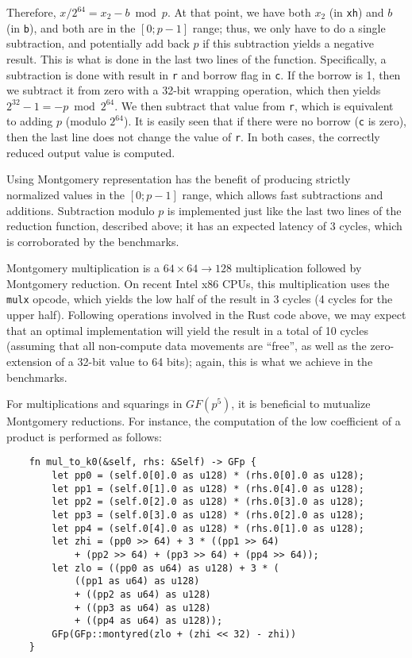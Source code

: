 \documentclass{llncs}
\newcommand{\GF}{GF}
\begin{document}
\begin{itemize}
    Therefore, $x/2^{64} = x_2 - b \bmod p$. At that point, we have both
    $x_2$ (in \verb+xh+) and $b$ (in \verb+b+), and both are in the
    $[0;p-1]$ range; thus, we only have to do a single subtraction, and
    potentially add back $p$ if this subtraction yields a negative
    result. This is what is done in the last two lines of the function.
    Specifically, a subtraction is done with result in \verb+r+ and
    borrow flag in \verb+c+. If the borrow is 1, then we subtract it
    from zero with a 32-bit wrapping operation, which then yields
    $2^{32}-1 = -p \bmod 2^{64}$. We then subtract that value from
    \verb+r+, which is equivalent to adding $p$ (modulo $2^{64}$). It is
    easily seen that if there were no borrow (\verb+c+ is zero), then
    the last line does not change the value of \verb+r+. In both cases,
    the correctly reduced output value is computed.

\end{itemize}

Using Montgomery representation has the benefit of producing strictly
normalized values in the $[0;p-1]$ range, which allows fast subtractions
and additions. Subtraction modulo $p$ is implemented just like the last
two lines of the reduction function, described above; it has an expected
latency of 3 cycles, which is corroborated by the benchmarks.

Montgomery multiplication is a $64\times 64\rightarrow 128$
multiplication followed by Montgomery reduction. On recent Intel x86
CPUs, this multiplication uses the \verb+mulx+ opcode, which yields the
low half of the result in 3 cycles (4 cycles for the upper half).
Following operations involved in the Rust code above, we may expect that
an optimal implementation will yield the result in a total of 10 cycles
(assuming that all non-compute data movements are ``free'', as well as
the zero-extension of a 32-bit value to 64 bits); again, this is what we
achieve in the benchmarks.

For multiplications and squarings in $\GF(p^5)$, it is beneficial to
mutualize Montgomery reductions. For instance, the computation of the
low coefficient of a product is performed as follows:
\begin{verbatim}
    fn mul_to_k0(&self, rhs: &Self) -> GFp {
        let pp0 = (self.0[0].0 as u128) * (rhs.0[0].0 as u128);
        let pp1 = (self.0[1].0 as u128) * (rhs.0[4].0 as u128);
        let pp2 = (self.0[2].0 as u128) * (rhs.0[3].0 as u128);
        let pp3 = (self.0[3].0 as u128) * (rhs.0[2].0 as u128);
        let pp4 = (self.0[4].0 as u128) * (rhs.0[1].0 as u128);
        let zhi = (pp0 >> 64) + 3 * ((pp1 >> 64)
            + (pp2 >> 64) + (pp3 >> 64) + (pp4 >> 64));
        let zlo = ((pp0 as u64) as u128) + 3 * (
            ((pp1 as u64) as u128)
            + ((pp2 as u64) as u128)
            + ((pp3 as u64) as u128)
            + ((pp4 as u64) as u128));
        GFp(GFp::montyred(zlo + (zhi << 32) - zhi))
    }
\end{verbatim}
\end{document}

